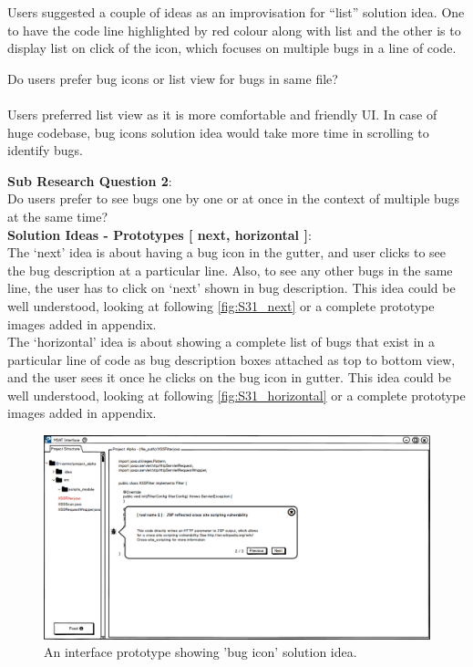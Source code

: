 Users suggested a couple of ideas as an improvisation for “list” solution idea. One to have the code line highlighted by red colour along with list and the other is to display list on click of the icon, which focuses on multiple bugs in a line of code. \\

\begin{myboxi}{{Do users prefer bug icons or list view for bugs in same file?}}
	\\ \\ Users preferred list view as it is more comfortable and friendly UI. In case of huge codebase, bug icons solution idea would take more time in scrolling to identify bugs. \\
\end{myboxi}


\textbf{Sub Research Question 2}: \\

Do users prefer to see bugs one by one or at once in the context of multiple bugs at the same time? \\

\textbf{Solution Ideas - Prototypes [ next, horizontal ]}: \\

The ‘next’ idea is about having a bug icon in the gutter, and user clicks to see the bug description at a particular line. Also, to see any other bugs in the same line, the user has to click on ‘next’ shown in bug description. This idea could be well understood, looking at following \autoref{fig:S31_next} or a complete prototype images added in appendix. \\

The ‘horizontal’ idea is about showing a complete list of bugs that exist in a particular line of code as bug description boxes attached as top to bottom view, and the user sees it once he clicks on the bug icon in gutter. This idea could be well understood, looking at following \autoref{fig:S31_horizontal} or a complete prototype images added in appendix. \\


\begin{figure}[hbt!]
	\centering
	\includegraphics[width=\linewidth]{figures/solution_ideas_snaps/S31_next}
	\caption{An interface prototype showing 'bug icon' solution idea.}
	\label{fig:S31_next}
\end{figure} 


